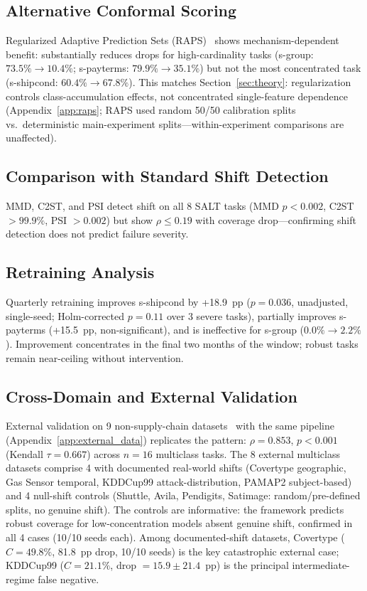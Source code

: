 \documentclass{uai2026} %
\begin{document}
\subsection{Alternative Conformal Scoring}\label{sec:raps}

Regularized Adaptive Prediction Sets (RAPS)~\citep{angelopoulos2021uncertainty} shows mechanism-dependent benefit: substantially reduces drops for high-cardinality tasks (s-group: $73.5\%\rightarrow10.4\%$; s-payterms: $79.9\%\rightarrow35.1\%$) but not the most concentrated task (s-shipcond: $60.4\%\rightarrow67.8\%$). This matches Section~\ref{sec:theory}: regularization controls class-accumulation effects, not concentrated single-feature dependence (Appendix~\ref{app:raps}; RAPS used random 50/50 calibration splits vs.\ deterministic main-experiment splits---within-experiment comparisons are unaffected).

\subsection{Comparison with Standard Shift Detection}\label{sec:shift_detection}

MMD, C2ST, and PSI detect shift on all 8 SALT tasks (MMD $p<0.002$, C2ST $>99.9\%$, PSI $>0.002$) but show $\rho \leq 0.19$ with coverage drop---confirming shift detection does not predict failure severity.

\subsection{Retraining Analysis}

Quarterly retraining improves s-shipcond by +18.9~pp ($p=0.036$, unadjusted, single-seed; Holm-corrected $p=0.11$ over 3 severe tasks), partially improves s-payterms (+15.5~pp, non-significant), and is ineffective for s-group ($0.0\%\rightarrow2.2\%$). Improvement concentrates in the final two months of the window; robust tasks remain near-ceiling without intervention.

\subsection{Cross-Domain and External Validation}\label{sec:cross_domain}

External validation on 9 non-supply-chain datasets~\citep{dua2017uci} with the same pipeline (Appendix~\ref{app:external_data}) replicates the pattern: $\rho=0.853$, $p<0.001$ (Kendall $\tau=0.667$) across $n=16$ multiclass tasks. The 8 external multiclass datasets comprise 4 with documented real-world shifts (Covertype geographic, Gas Sensor temporal, KDDCup99 attack-distribution, PAMAP2 subject-based) and 4 null-shift controls (Shuttle, Avila, Pendigits, Satimage: random/pre-defined splits, no genuine shift). The controls are informative: the framework predicts robust coverage for low-concentration models absent genuine shift, confirmed in all 4 cases (10/10 seeds each). Among documented-shift datasets, Covertype ($C=49.8\%$, 81.8~pp drop, 10/10 seeds) is the key catastrophic external case; KDDCup99 ($C=21.1\%$, drop $=15.9\pm21.4$~pp) is the principal intermediate-regime false negative.
\end{document}
